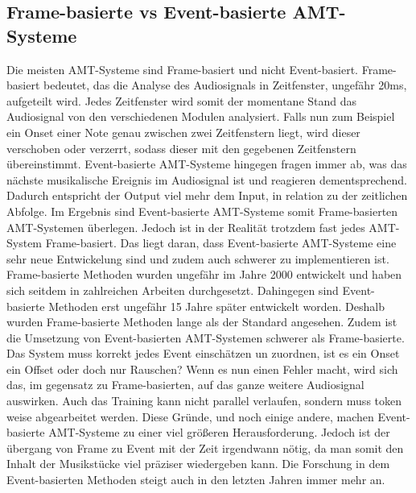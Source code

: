 \subsection{Frame-basierte vs Event-basierte AMT-Systeme}
Die meisten AMT-Systeme sind Frame-basiert und nicht Event-basiert.
Frame-basiert bedeutet, das die Analyse des Audiosignals in Zeitfenster, ungefähr 20ms, aufgeteilt wird.
Jedes Zeitfenster wird somit der momentane Stand das Audiosignal von den verschiedenen Modulen analysiert.
Falls nun zum Beispiel ein Onset einer Note genau zwischen zwei Zeitfenstern liegt,
wird dieser verschoben oder verzerrt, sodass dieser mit den gegebenen Zeitfenstern übereinstimmt.
Event-basierte AMT-Systeme hingegen fragen immer ab,
was das nächste musikalische Ereignis im Audiosignal ist und reagieren dementsprechend.
Dadurch entspricht der Output viel mehr dem Input, in relation zu der zeitlichen Abfolge.
Im Ergebnis sind Event-basierte AMT-Systeme somit Frame-basierten AMT-Systemen überlegen.
Jedoch ist in der Realität trotzdem fast jedes AMT-System Frame-basiert.
Das liegt daran, dass Event-basierte AMT-Systeme eine sehr neue Entwickelung sind
und zudem auch schwerer zu implementieren ist.
Frame-basierte Methoden wurden ungefähr im Jahre 2000 entwickelt
und haben sich seitdem in zahlreichen Arbeiten durchgesetzt.
\cite{Martin1996, klapuri1998automatic}
Dahingegen sind Event-basierte Methoden erst ungefähr 15 Jahre später entwickelt worden.
\cite{performance_rnn2017event}
Deshalb wurden Frame-basierte Methoden lange als der Standard angesehen.
Zudem ist die Umsetzung von Event-basierten AMT-Systemen schwerer als Frame-basierte.
Das System muss korrekt jedes Event einschätzen un zuordnen, ist es ein Onset ein Offset oder doch nur Rauschen?
Wenn es nun einen Fehler macht, wird sich das,
im gegensatz zu Frame-basierten, auf das ganze weitere Audiosignal auswirken.
Auch das Training kann nicht parallel verlaufen, sondern muss token weise abgearbeitet werden.
Diese Gründe, und noch einige andere, machen Event-basierte AMT-Systeme zu einer viel größeren Herausforderung.
Jedoch ist der übergang von Frame zu Event mit der Zeit irgendwann nötig, da man somit den Inhalt der Musikstücke
viel präziser wiedergeben kann.
Die Forschung in dem Event-basierten Methoden steigt auch in den letzten Jahren immer mehr an.

